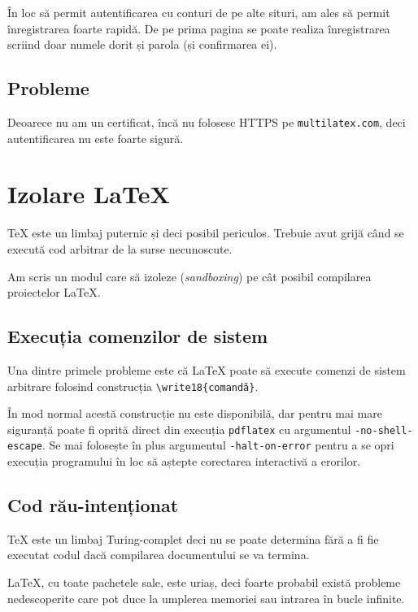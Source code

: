 \documentclass[a4wide,12pt]{report}
\newcommand{\eng}[1]{\emph{#1}} %
\newcommand{\cod}[1]{\texttt{#1}}
\newcommand{\poate}[1]{#1}
\begin{document}
În loc să permit autentificarea cu conturi de pe alte situri, am ales să permit
înregistrarea foarte rapidă. De pe prima pagina se poate realiza înregistrarea
scriind doar numele dorit și parola (și confirmarea ei).

\subsection{Probleme}

Deoarece nu am un certificat, încă nu folosesc HTTPS pe \cod{multilatex.com},
deci autentificarea nu este foarte sigură.

\section{Izolare \LaTeX}

\TeX{} este un limbaj puternic și deci posibil periculos. Trebuie avut grijă când
se execută cod arbitrar de la surse necunoscute.

Am scris un modul care să izoleze (\eng{sandboxing}) pe cât posibil compilarea
proiectelor \LaTeX{}.

\subsection{Execuția comenzilor de sistem}

Una dintre primele probleme este că \LaTeX{} poate să execute comenzi de sistem
arbitrare folosind construcția \cod{\textbackslash write18\{comandă\}}.

În mod normal acestă construcție nu este disponibilă, dar pentru mai mare
siguranță poate fi oprită direct din execuția \cod{pdflatex} cu argumentul
\cod{-no-shell-escape}. \poate{Se mai folosește în plus argumentul
\cod{-halt-on-error} pentru a se opri execuția programului în loc să aștepte
corectarea interactivă a erorilor.}

\subsection{Cod rău-intenționat}

\TeX{} este un limbaj Turing-complet\cite{basictc} deci nu se poate determina fără a fi fie
executat codul dacă compilarea documentului se va termina.

\LaTeX{}, cu toate pachetele sale, este uriaș, deci foarte probabil există
probleme nedescoperite care pot duce la umplerea memoriei sau intrarea în bucle
infinite.
\end{document}

